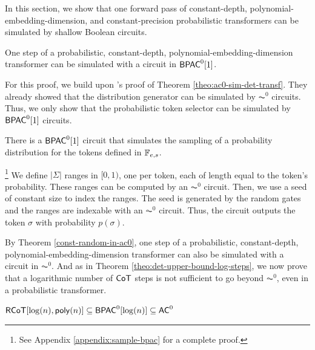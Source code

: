In this section, we show that one forward pass of constant-depth, polynomial-embedding-dimension, and constant-precision probabilistic transformers can be simulated by shallow Boolean circuits.

\begin{theorem}\label{theo:ac0-sim-prob-transf}
    One step of a probabilistic, constant-depth, polynomial-embedding-dimension transformer can be simulated with a circuit in $\mathsf{BPAC}^0[1]$.
\end{theorem}

For this proof, we build upon \citet{toyota}'s proof of Theorem \ref{theo:ac0-sim-det-transf}.
They already showed that the distribution generator can be simulated by $\AC^0$ circuits.
Thus, we only show that the probabilistic token selector can be simulated by $\mathsf{BPAC}^0[1]$ circuits.

\begin{lemma}
    There is a $\mathsf{BPAC}^0[1]$ circuit that simulates the sampling of a probability distribution for the tokens defined in $\mathbb{F}_{e,s}$.
\end{lemma}

\begin{proofsketch}\footnote{See Appendix \ref{appendix:sample-bpac} for a complete proof.}
    We define $|\Sigma|$ ranges in $[0,1)$, one per token, each of length equal to the token's probability.
    These ranges can be computed by an $\AC^0$ circuit.
    Then, we use a seed of constant size to index the ranges.
    The seed is generated by the random gates and the ranges are indexable with an $\AC^0$ circuit.
    Thus, the circuit outputs the token $\sigma$ with probability $p(\sigma)$.
\end{proofsketch}

\bigskip

By Theorem \ref{const-random-in-ac0}, one step of a probabilistic, constant-depth, polynomial-embedding-dimension transformer can also be simulated with a circuit in $\AC^0$.
And as in Theorem \ref{theo:det-upper-bound-log-steps}, we now prove that a logarithmic number of $\mathsf{CoT}$ steps is not sufficient to go beyond $\AC^0$, even in a probabilistic transformer.

\begin{theorem}\label{theo:prob-upper-bound-log-steps}
    $\mathsf{RCoT}[\log(n), \mathsf{poly}(n)] \subseteq \mathsf{BPAC}^0[\log(n)] \subseteq \mathsf{AC}^0$
\end{theorem}

